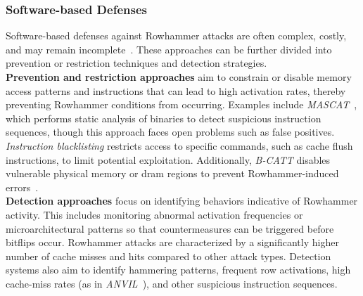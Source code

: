         \subsubsection{Software-based Defenses} \label{subsubsec:software-based-defenses}
            Software-based defenses against Rowhammer attacks are often complex, costly, and may remain incomplete~\cite{paperTRRespass}. 
            These approaches can be further divided into prevention or restriction techniques and detection strategies. 
            \\
            \textbf{Prevention and restriction approaches} aim to constrain or disable memory access patterns and instructions 
            that can lead to high activation rates, thereby preventing Rowhammer conditions from occurring. Examples 
            include \textit{MASCAT}~\cite{paperMASCAT}, which performs static analysis of binaries to detect suspicious instruction sequences, 
            though this approach faces open problems such as false positives. \textit{Instruction blacklisting} restricts access 
            to specific commands, such as cache flush instructions, to limit potential exploitation. Additionally, 
            \textit{B-CATT} disables vulnerable physical memory or \gls{dram} regions to prevent Rowhammer-induced errors~\cite{paperCantTouchThis, webAnotherFlip}.
            \\
            \textbf{Detection approaches} focus on identifying behaviors indicative of Rowhammer activity. This includes monitoring 
            abnormal activation frequencies or microarchitectural patterns so that countermeasures can be triggered before 
            bitflips occur. Rowhammer attacks are characterized by a significantly higher number of cache misses and hits 
            compared to other attack types. Detection systems also aim to identify hammering patterns, frequent row 
            activations, high cache-miss rates (as in \textit{ANVIL}~\cite{paperANVIL}), and other suspicious instruction sequences.
        
